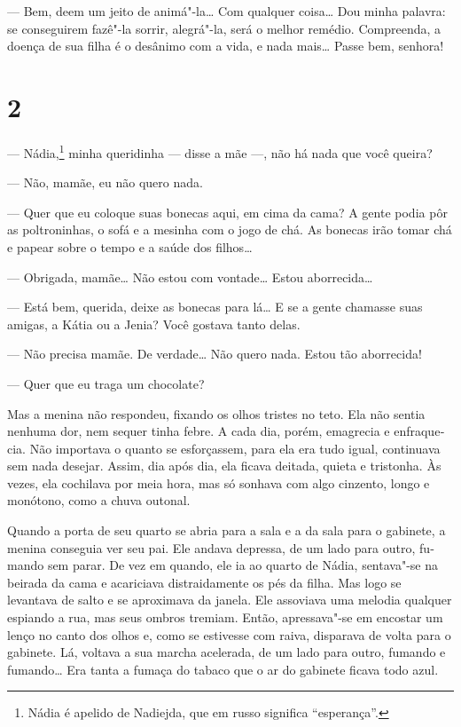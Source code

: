 --- Bem, deem um jeito de animá"-la\ldots{} Com qualquer coisa\ldots{} Dou minha
palavra: se conseguirem fazê"-la sor­rir, alegrá"-la, será o melhor
remédio. Compreenda, a doença de sua filha é o desânimo com a vida, e
nada mais\ldots{} Passe bem, senhora!

\section{2}

--- Nádia,\footnote{Nádia é apelido de Nadiejda, que em russo
  significa ``esperança''.} minha queridinha --- disse a mãe ---, não há
nada que você queira?

--- Não, mamãe, eu não quero nada.

--- Quer que eu coloque suas bonecas aqui, em cima da cama? A gente
podia pôr as poltroninhas, o sofá e a mesinha com o jogo de chá. As
bonecas irão tomar chá e papear sobre o tempo e a saúde dos filhos\ldots{}

--- Obrigada, mamãe\ldots{} Não estou com vontade\ldots{} Es­tou aborrecida\ldots{}

--- Está bem, querida, deixe as bonecas para lá\ldots{} E se a gente chamasse
suas amigas, a Kátia ou a Jenia? Você gostava tanto delas.

--- Não precisa mamãe. De verdade\ldots{} Não quero nada. Estou tão
aborrecida!

--- Quer que eu traga um chocolate?

Mas a menina não respondeu, fixando os olhos tris­tes no teto. Ela não
sentia nenhuma dor, nem sequer tinha febre. A cada dia, porém, emagrecia
e enfraque­cia. Não importava o quanto se esforçassem, para ela era tudo
igual, continuava sem nada desejar. Assim, dia após dia, ela ficava
deitada, quieta e tristonha. Às vezes, ela cochilava por meia hora, mas
só sonhava com algo cinzento, longo e monótono, como a chuva outonal.

Quando a porta de seu quarto se abria para a sala e a da sala para o
gabinete, a menina conseguia ver seu pai. Ele andava depressa, de um
lado para outro, fu­mando sem parar. De vez em quando, ele ia ao quarto
de Nádia, sentava"-se na beirada da cama e acariciava distraidamente os
pés da filha. Mas logo se levantava de salto e se aproximava da janela.
Ele assoviava uma melodia qualquer espiando a rua, mas seus om­bros
tremiam. Então, apressava"-se em encostar um lenço no canto dos olhos e,
como se estivesse com rai­va, disparava de volta para o gabinete. Lá,
voltava a sua marcha acelerada, de um lado para outro, fumando e
fumando\ldots{} Era tanta a fumaça do tabaco que o ar do gabinete ficava todo
azul.

